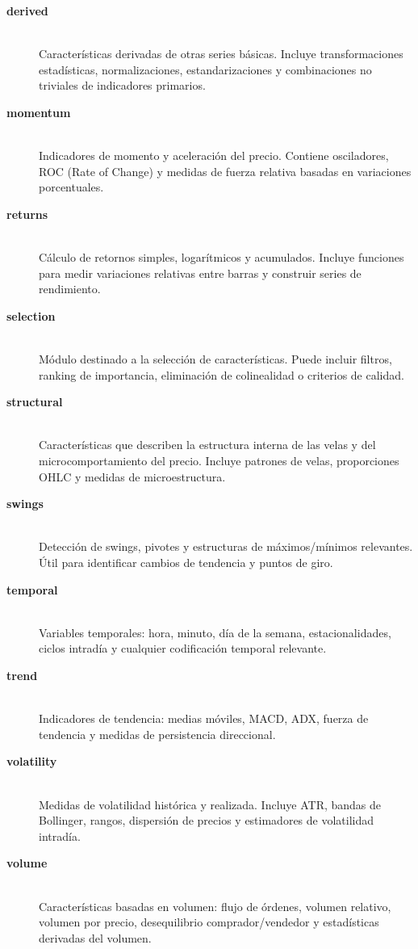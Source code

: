 \begin{description}

\item[\textbf{derived}] \hfill \\
Características derivadas de otras series básicas. Incluye transformaciones estadísticas, normalizaciones, estandarizaciones y combinaciones no
triviales de indicadores primarios.

\item[\textbf{momentum}] \hfill \\
Indicadores de momento y aceleración del precio. Contiene osciladores, ROC (Rate of Change) y medidas de fuerza relativa basadas en variaciones
porcentuales.

\item[\textbf{returns}] \hfill \\
Cálculo de retornos simples, logarítmicos y acumulados. Incluye funciones para medir variaciones relativas entre barras y construir series de
rendimiento.

\item[\textbf{selection}] \hfill \\
Módulo destinado a la selección de características. Puede incluir filtros, ranking de importancia, eliminación de colinealidad o criterios de calidad.

\item[\textbf{structural}] \hfill \\
Características que describen la estructura interna de las velas y del microcomportamiento del precio. Incluye patrones de velas, proporciones OHLC y
medidas de microestructura.

\item[\textbf{swings}] \hfill \\
Detección de swings, pivotes y estructuras de máximos/mínimos relevantes. Útil para identificar cambios de tendencia y puntos de giro.

\item[\textbf{temporal}] \hfill \\
Variables temporales: hora, minuto, día de la semana, estacionalidades, ciclos intradía y cualquier codificación temporal relevante.

\item[\textbf{trend}] \hfill \\
Indicadores de tendencia: medias móviles, MACD, ADX, fuerza de tendencia y medidas de persistencia direccional.

\item[\textbf{volatility}] \hfill \\
Medidas de volatilidad histórica y realizada. Incluye ATR, bandas de Bollinger, rangos, dispersión de precios y estimadores de volatilidad intradía.

\item[\textbf{volume}] \hfill \\
Características basadas en volumen: flujo de órdenes, volumen relativo, volumen por precio, desequilibrio comprador/vendedor y estadísticas derivadas
del volumen.

\end{description}

